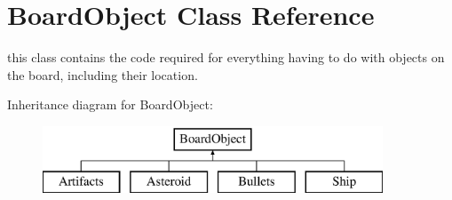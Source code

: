 \hypertarget{class_board_object}{}\section{Board\+Object Class Reference}
\label{class_board_object}


this class contains the code required for everything having to do with objects on the board, including their location.  


Inheritance diagram for Board\+Object\+:\begin{figure}[H]
\begin{center}
\leavevmode
\includegraphics[height=2.000000cm]{class_board_object}
\end{center}
\end{figure}
